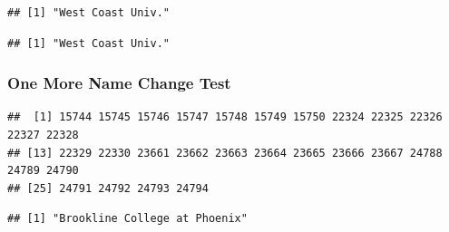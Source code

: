 \documentclass[
]{article}
\newenvironment{Shaded}{\begin{snugshade}}{\end{snugshade}}
\newcommand{\DecValTok}[1]{\textcolor[rgb]{0.00,0.00,0.81}{#1}}
\newcommand{\KeywordTok}[1]{\textcolor[rgb]{0.13,0.29,0.53}{\textbf{#1}}}
\newcommand{\NormalTok}[1]{#1}
\newcommand{\OperatorTok}[1]{\textcolor[rgb]{0.81,0.36,0.00}{\textbf{#1}}}
\newcommand{\StringTok}[1]{\textcolor[rgb]{0.31,0.60,0.02}{#1}}
\begin{document}
\begin{verbatim}
## [1] "West Coast Univ."
\end{verbatim}

\begin{Shaded}
\end{Shaded}

\begin{verbatim}
## [1] "West Coast Univ."
\end{verbatim}

\hypertarget{one-more-name-change-test}{%
\subsubsection{One More Name Change
Test}\label{one-more-name-change-test}}

\begin{Shaded}
\end{Shaded}

\begin{verbatim}
##  [1] 15744 15745 15746 15747 15748 15749 15750 22324 22325 22326 22327 22328
## [13] 22329 22330 23661 23662 23663 23664 23665 23666 23667 24788 24789 24790
## [25] 24791 24792 24793 24794
\end{verbatim}

\begin{Shaded}
\end{Shaded}

\begin{verbatim}
## [1] "Brookline College at Phoenix"
\end{verbatim}

\begin{Shaded}
\end{Shaded}
\end{document}

